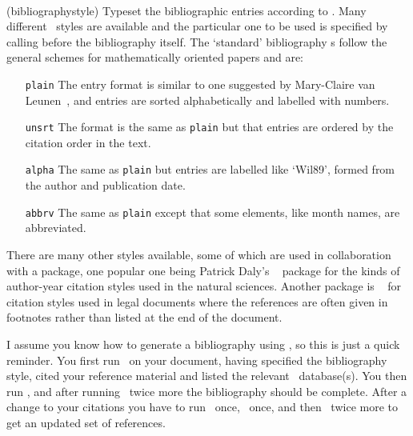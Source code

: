 \begin{syntax}
\cmd{} \\
\end{syntax}
\glossary(bibliographystyle)%
  {}%
  {Typeset the bibliographic entries according to .}
Many different \Pbibtex\ styles
are available and the particular one to be used is specified
by calling \cmd{} before the bibliography itself.
The `standard' bibliography s follow the general schemes
for mathematically oriented papers and are:
\begin{itemize}
\item[\texttt{plain}] 
     The entry format is similar to one suggested by
     Mary-Claire van Leunen~\cite{LEUNEN92}, and entries are sorted
     alphabetically and labelled with numbers.
\item[\texttt{unsrt}] 
     The format is the same as \texttt{plain} but
     that entries are ordered by the citation order in the text.
\item[\texttt{alpha}] 
     The same as \texttt{plain} but entries are 
     labelled like `Wil89', formed from the author and publication date.
\item[\texttt{abbrv}] 
     The same as \texttt{plain} except that some elements, like month 
     names, are abbreviated.
\end{itemize}
There are many other styles available, some of which are used
in collaboration with a package, one popular one being 
Patrick Daly's ~\cite{NATBIB} package for the kinds of 
author-year citation styles used in the natural sciences. 
Another package is ~\cite{JURABIB} for citation styles
used in legal documents where the references are often given in footnotes
rather than listed at the end of the document.

    I assume you know how to 
generate a bibliography using \Lbibtex,
so this is just a quick reminder. You first run \ltx\
on your document, having specified the bibliography style, cited
your reference material and listed the relevant \Lbibtex\ database(s). 
You then run \Lbibtex, and after running \ltx\ twice more the
bibliography should be complete. After a change to your citations you have to
run \ltx\ once, \Lbibtex\ once, and then \ltx\ twice more to get an 
updated set of references.


